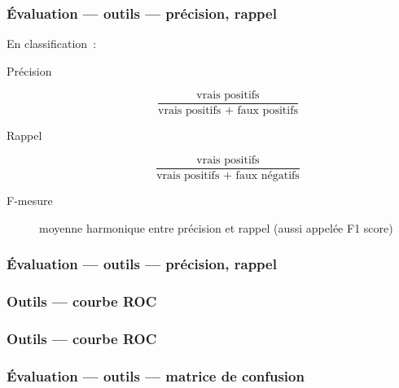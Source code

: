 \begin{frame}
  \frametitle{Évaluation — outils — précision, rappel}
  En classification :
  \begin{description}
  \item[Précision]
    \[
    \frac{\text{vrais positifs}}{\text{vrais positifs + faux positifs}}
    \]
  \item[Rappel]
    \[
    \frac{\text{vrais positifs}}{\text{vrais positifs + faux négatifs}}
  \]
  \item[F-mesure] moyenne harmonique entre précision et rappel (aussi
    appelée F1 score)
  \end{description}
\end{frame}

\begin{frame}
  \frametitle{Évaluation — outils — précision, rappel}
\end{frame}

\begin{frame}
  \frametitle{Outils — courbe ROC}
\end{frame}

\begin{frame}
  \frametitle{Outils — courbe ROC}
\end{frame}

\begin{frame}
  \frametitle{Évaluation — outils — matrice de confusion}
\end{frame}
